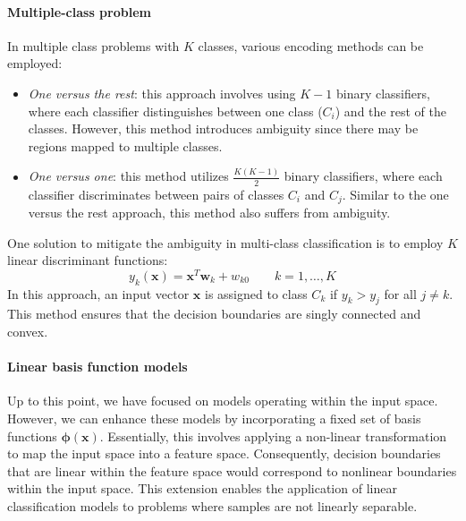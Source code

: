 \paragraph*{Multiple-class problem}
In multiple class problems with $K$ classes, various encoding methods can be employed:
\begin{itemize}
    \item \textit{One versus the rest}: this approach involves using $K-1$ binary classifiers, where each classifier distinguishes between one class ($C_i$) and the rest of the classes.
        However, this method introduces ambiguity since there may be regions mapped to multiple classes.
    \item \textit{One versus one}: this method utilizes $\frac{K(K-1)}{2}$ binary classifiers, where each classifier discriminates between pairs of classes $C_i$ and $C_j$. 
        Similar to the one versus the rest approach, this method also suffers from ambiguity.
\end{itemize}
One solution to mitigate the ambiguity in multi-class classification is to employ $K$ linear discriminant functions:
\[y_k(\textbf{x})=\textbf{x}^T\textbf{w}_k+w_{k0} \qquad k=1,\dots,K\]
In this approach, an input vector $\textbf{x}$ is assigned to class $C_k$ if $y_k>y_j$ for all $j \neq k$. 
This method ensures that the decision boundaries are singly connected and convex.






\paragraph*{Linear basis function models}
Up to this point, we have focused on models operating within the input space.
However, we can enhance these models by incorporating a fixed set of basis functions $\boldsymbol{\phi}(\textbf{x})$. 
Essentially, this involves applying a non-linear transformation to map the input space into a feature space. 
Consequently, decision boundaries that are linear within the feature space would correspond to nonlinear boundaries within the input space.
This extension enables the application of linear classification models to problems where samples are not linearly separable.

